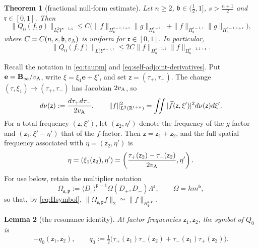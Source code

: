 \documentclass[11pt,reqno]{amsart}
\theoremstyle{plain}
\newtheorem{theorem}{Theorem}[section]
\newtheorem{lemma}[theorem]{Lemma}
\theoremstyle{definition}
\theoremstyle{remark}
\numberwithin{equation}{section}
\newcommand{\breg}{\mathfrak b}
\newcommand{\sreg}{\mathfrak s}
\newcommand{\preg}{\mathfrak p}
\newcommand{\rpar}{\mathfrak r}
\newcommand{\Binf}{\mathbf B_\infty}
\newcommand{\Real}{\mathbb R}
\newcommand{\Rst}{\Real^{1+n}}
\begin{document}
\begin{theorem}[fractional null-form estimate]\label{thm:null-form}
Let $n\ge2$, $\breg\in(\frac12,1]$, $s>\frac{n+1}2$ and
$\rpar\in[0,1]$. Then
\begin{equation}\label{eq:null-form}
 \|Q_0(f,g)\|_{L^2_tY^{s-1,\rpar}}
 \le C\Big(
   \|f\|_{H^{s-1,1+\rpar}_{\breg}}
   \|g\|_{H^{s-1,1}_{\breg}}
  +\|f\|_{H^{s-1,1}_{\breg}}
   \|g\|_{H^{s-1,1+\rpar}_{\breg}}
 \Big),
\end{equation}
where $C=C(n,s,\breg,v_{\rm A})$ is uniform for
$\rpar\in[0,1]$. In particular,
\begin{equation}\label{eq:diagonalNF}
     \|Q_0(f,f)\|_{L^2_tY^{s-1,\rpar}}
 \le 2C\|f\|_{H^{s-1,1}_{\breg}}
          \|f\|_{H^{s-1,1+\rpar}_{\breg}}.
\end{equation}
\end{theorem}

Recall the notation in \eqref{eq:taupm} and \eqref{eq:self-adjoint-derivatives}. Put $\mathbf e=\Binf/v_{\rm A}$, write
$\xi=\xi_1\mathbf e+\xi'$, and set
$\mathsf z=(\tau_+,\tau_-)$.  The change
$(\tau,\xi_1)\mapsto(\tau_+,\tau_-)$ has Jacobian
$2v_{\rm A}$, so
\begin{equation}\label{eq:null-coordinate-plancherel}
 d\nu(\mathsf z):=\frac{d\tau_+ d\tau_-}{2v_{\rm A}},
 \qquad
 \|f\|_{L^2(\Rst)}^2
 =\iint|\widetilde f(\mathsf z,\xi')|^2 d\nu(\mathsf z) d\xi'.
\end{equation}
For a total frequency $(\mathsf z,\xi')$, let
$(\mathsf z_2,\eta')$ denote the frequency of the $g$-factor and
$(\mathsf z_1,\xi'-\eta')$ that of the $f$-factor. Then
$\mathsf z=\mathsf z_1+\mathsf z_2$, and the full spatial frequency associated
with $\eta=(\mathsf z_2,\eta')$ is
\[
 \eta=(\xi_1(\mathsf z_2),\eta')=\left(\frac{\tau_+(\mathsf z_2)-\tau_-(\mathsf z_2)}
 {2v_{\rm A}}, \eta'\right).
\]
For use below, retain the multiplier notation
\begin{equation}\label{eq:null-weight-operator}
 \Omega_{\sreg,\preg}
 :=\langle D_\parallel\rangle^{\preg-1}
   \Omega(D_+,D_-)\Lambda^{\sreg},
 \qquad \Omega=hm^{\breg},
\end{equation}
so that, by \eqref{eq:Hsymbol},
$\|\Omega_{\sreg,\preg}f\|_2\simeq
\|f\|_{H^{\sreg,\preg}_{\breg}}$.

\begin{lemma}[the resonance identity]\label{lem:resonance}
At factor frequencies $\mathsf z_1,\mathsf z_2$, the symbol of $Q_0$ is
\[
 -q_0(\mathsf z_1,\mathsf z_2),\qquad
 q_0:=\tfrac12\big(
 \tau_+(\mathsf z_1)\tau_-(\mathsf z_2)
 +\tau_-(\mathsf z_1)\tau_+(\mathsf z_2)\big).
\]
\end{lemma}
\end{document}
